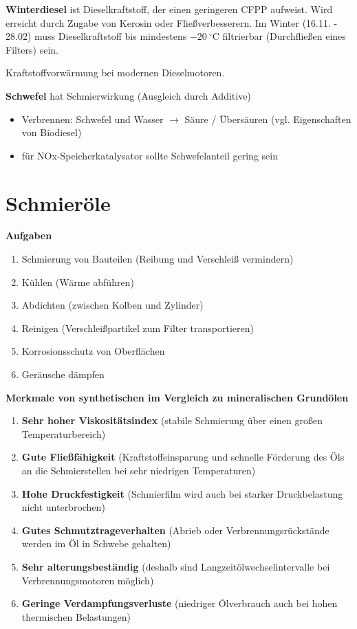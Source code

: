 \textbf{Winterdiesel} ist Dieselkraftstoff, der einen geringeren CFPP
aufweist. Wird erreicht durch Zugabe von Kerosin oder Fließverbesserern.
Im Winter (16.11. - 28.02) muss Dieselkraftstoff bis mindestens
$- 20~^\circ\text{C}$ filtrierbar (Durchfließen eines Filters) sein.

Kraftstoffvorwärmung bei modernen Dieselmotoren.

\textbf{Schwefel} hat Schmierwirkung (Ausgleich durch Additive)

\begin{itemize}
\item
  Verbrennen: Schwefel und Wasser $\to$ Säure / Übersäuren (vgl.
  Eigenschaften von Biodiesel)
\item
  für NOx-Speicherkatalysator sollte Schwefelanteil gering sein
\end{itemize}

\section{Schmieröle}\label{schmieroele}

\textbf{Aufgaben}

\begin{enumerate}
\item
  Schmierung von Bauteilen (Reibung und Verschleiß vermindern)
\item
  Kühlen (Wärme abführen)
\item
  Abdichten (zwischen Kolben und Zylinder)
\item
  Reinigen (Verschleißpartikel zum Filter transportieren)
\item
  Korrosionsschutz von Oberflächen
\item
  Geräusche dämpfen
\end{enumerate}

\textbf{Merkmale von synthetischen im Vergleich zu mineralischen
Grundölen}

\begin{enumerate}
\item
  \textbf{Sehr hoher Viskositätsindex} (stabile Schmierung über einen
  großen Temperaturbereich)
\item
  \textbf{Gute Fließfähigkeit} (Kraftstoffeinsparung und schnelle
  Förderung des Öls an die Schmierstellen bei sehr niedrigen
  Temperaturen)
\item
  \textbf{Hohe Druckfestigkeit} (Schmierfilm wird auch bei starker
  Druckbelastung nicht unterbrochen)
\item
  \textbf{Gutes Schmutztrageverhalten} (Abrieb oder
  Verbrennungsrückstände werden im Öl in Schwebe gehalten)
\item
  \textbf{Sehr alterungsbeständig} (deshalb sind
  Langzeitölwechselintervalle bei Verbrennungsmotoren möglich)
\item
  \textbf{Geringe Verdampfungsverluste} (niedriger Ölverbrauch auch bei
  hohen thermischen Belastungen)
\end{enumerate}

